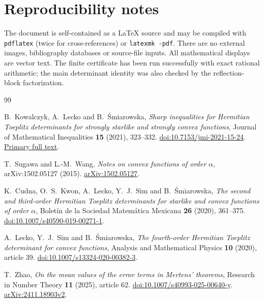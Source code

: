 \documentclass[11pt,a4paper]{article}
\numberwithin{equation}{section}
\theoremstyle{definition}\newtheorem{definition}[theorem]{Definition}
\theoremstyle{remark}\newtheorem{remark}[theorem]{Remark}
\begin{document}
\section{Reproducibility notes}

The document is self-contained as a LaTeX source and may be compiled with
\texttt{pdflatex} (twice for cross-references) or \texttt{latexmk -pdf}.
There are no external images, bibliography databases or source-file inputs.
All mathematical displays are vector text. The finite certificate has been
run successfully with exact rational arithmetic; the main determinant
identity was also checked by the reflection-block factorization.


{}
\begin{thebibliography}{99}

B.~Kowalczyk, A.~Lecko and B.~\'Smiarowska,
\emph{Sharp inequalities for Hermitian Toeplitz determinants for
strongly starlike and strongly convex functions},
Journal of Mathematical Inequalities \textbf{15} (2021), 323--332.
\href{https://doi.org/10.7153/jmi-2021-15-24}{doi:10.7153/jmi-2021-15-24}.
\href{https://files.ele-math.com/articles/jmi-15-24.pdf}{Primary full text}.

T.~Sugawa and L.-M.~Wang,
\emph{Notes on convex functions of order $\alpha$},
arXiv:1502.05127 (2015).
\href{https://arxiv.org/abs/1502.05127}{arXiv:1502.05127}.

K.~Cudna, O.~S.~Kwon, A.~Lecko, Y.~J.~Sim and B.~\'Smiarowska,
\emph{The second and third-order Hermitian Toeplitz determinants
for starlike and convex functions of order $\alpha$},
Bolet\'in de la Sociedad Matem\'atica Mexicana \textbf{26}
(2020), 361--375.
\href{https://doi.org/10.1007/s40590-019-00271-1}{doi:10.1007/s40590-019-00271-1}.

A.~Lecko, Y.~J.~Sim and B.~\'Smiarowska,
\emph{The fourth-order Hermitian Toeplitz determinant for convex
functions}, Analysis and Mathematical Physics \textbf{10}
(2020), article 39.
\href{https://doi.org/10.1007/s13324-020-00382-3}{doi:10.1007/s13324-020-00382-3}.

T.~Zhao,
\emph{On the mean values of the error terms in Mertens' theorems},
Research in Number Theory \textbf{11} (2025), article 62.
\href{https://doi.org/10.1007/s40993-025-00640-y}{doi:10.1007/s40993-025-00640-y}.
\href{https://arxiv.org/html/2411.18903v2}{arXiv:2411.18903v2}.


\end{thebibliography}
\end{document}
